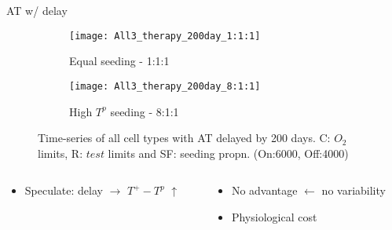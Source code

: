 \begin{frame}{AT w/ delay}
  \begin{figure}[h]
    \centering
    \begin{subfigure}[b]{0.48\textwidth}
      \centering
      \texttt{[image: All3\_therapy\_200day\_1:1:1]}
      \caption{Equal seeding - 1:1:1}
    \end{subfigure}
    \begin{subfigure}[b]{0.48\textwidth}
      \centering
      \texttt{[image: All3\_therapy\_200day\_8:1:1]}
      \caption{High $T^p$ seeding - 8:1:1}
    \end{subfigure}
    \caption{Time-series of all cell types with AT delayed by 200 days. C: $O_2$ limits, R: $test$ limits and SF: seeding propn. (On:6000, Off:4000)}
  \end{figure}
  \begin{columns}
    \begin{column}{0.5\textwidth}
      \begin{itemize}
        \item Speculate: delay $\rightarrow$ $T^+ - T^p$ $\uparrow$
      \end{itemize}
    \end{column}
    \begin{column}{0.5\textwidth}
      \begin{itemize}
        \item No advantage $\leftarrow$ no variability
        \item Physiological cost
      \end{itemize}
    \end{column}
  \end{columns}
\end{frame}

